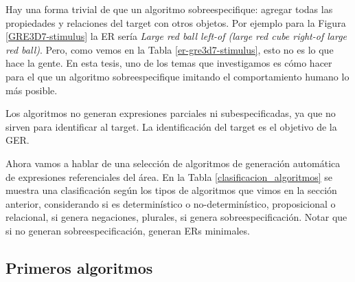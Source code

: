 Hay una forma trivial de que un algoritmo sobreespecifique: agregar todas las propiedades y relaciones del target con otros objetos. Por ejemplo para la Figura \ref{GRE3D7-stimulus} la ER ser\'ia {\it Large red ball left-of (large red cube right-of large red ball)}. Pero, como vemos en la Tabla \ref{er-gre3d7-stimulus}, esto no es lo que hace la gente. En esta tesis, uno de los temas que investigamos es c\'omo hacer para el que un algoritmo sobreespecifique imitando el comportamiento humano lo m\'as posible. 

Los algoritmos no generan expresiones parciales ni subespecificadas, ya que no sirven para identificar al target. La identificaci\'on del target es el objetivo de la GER.





Ahora vamos a hablar de una selecci\'on de algoritmos de generaci\'on autom\'atica de expresiones referenciales del \'area. En la Tabla \ref{clasificacion_algoritmos} se muestra una clasificaci\'on seg\'un los tipos de algoritmos que vimos en la secci\'on anterior, considerando si es determin\'istico o no-determin\'istico, proposicional o relacional, si genera negaciones, plurales, si genera sobreespecificaci\'on. Notar que si no generan sobreespecificaci\'on, generan ERs minimales.

\subsection{Primeros algoritmos}

\label{sec:algoritmos_area}

